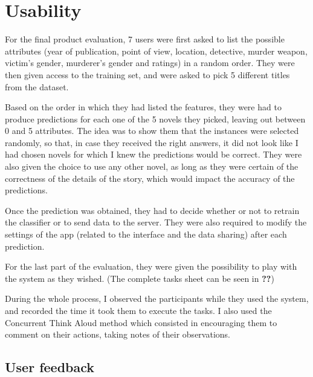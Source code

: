 \documentclass{mproj}
\begin{document}
\section{Usability}

For the final product evaluation, 7 users were first asked to list the possible attributes (year of publication, point of view, location, detective, murder weapon, victim's gender, murderer's gender and ratings) in a random order. They were then given access to the training set, and were asked to pick 5 different titles from the dataset. \par

Based on the order in which they had listed the features, they were had to produce predictions for each one of the 5 novels they picked, leaving out between 0 and 5 attributes. The idea was to show them that the instances were selected randomly, so that, in case they received the right answers, it did not look like I had chosen novels for which I knew the predictions would be correct. They were also given the choice to use any other novel, as long as they were certain of the correctness of the details of the story, which would impact the accuracy of the predictions. \par 

Once the prediction was obtained, they had to decide whether or not to retrain the classifier or to send data to the server. They were also required to modify the settings of the app (related to the interface and the data sharing) after each prediction. \par

For the last part of the evaluation, they were given the possibility to play with the system as they wished. (The complete tasks sheet can be seen in \textbf{??})\par

During the whole process, I observed the participants while they used the system, and recorded the time it took them to execute the tasks. I also used the Concurrent Think Aloud method \cite{usabilitytest} which consisted in encouraging them to comment on their actions, taking notes of their observations.

\subsection{User feedback}
\end{document}
